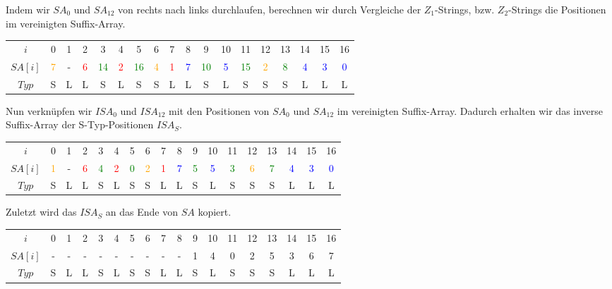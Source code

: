 Indem wir $SA_0$ und $SA_{12}$ von rechts nach links durchlaufen, berechnen wir durch Vergleiche der $Z_1$-Strings, bzw. $Z_2$-Strings die Positionen im vereinigten Suffix-Array. 

\begin{table}[H]
	\footnotesize
	\centering
	\begin{tabular}{c| c c c c c c c c c c c c c c c c c}
		$i$ & 0 & 1 & 2 & 3 & 4 & 5 & 6 & 7 & 8 & 9 & 10 & 11 & 12 & 13 & 14 & 15 & 16 \\
		$SA[i]$ & \textcolor{orange}{7} & - & \textcolor{red}{6} & \textcolor{green}{14} & \textcolor{red}{2} & \textcolor{green}{16} & \textcolor{orange}{4} & \textcolor{red}{1} & \textcolor{blue}{7} & \textcolor{green}{10} & \textcolor{blue}{5} & \textcolor{green}{15} & \textcolor{orange}{2} & \textcolor{green}{8} & \textcolor{blue}{4} & \textcolor{blue}{3} & \textcolor{blue}{0} \\
		$Typ$ & S & L & L & S & L & S & S & L & L & S & L & S & S & S & L & L & L
	\end{tabular}
\end{table}

Nun verknüpfen wir $ISA_0$ und $ISA_{12}$ mit den Positionen von $SA_0$ und $SA_{12}$ im vereinigten Suffix-Array. Dadurch erhalten wir das inverse Suffix-Array der S-Typ-Positionen $ISA_S$.

\begin{table}[H]
	\footnotesize
	\centering
	\begin{tabular}{c| c c c c c c c c c c c c c c c c c}
		$i$ & 0 & 1 & 2 & 3 & 4 & 5 & 6 & 7 & 8 & 9 & 10 & 11 & 12 & 13 & 14 & 15 & 16 \\
		$SA[i]$ & \textcolor{orange}{1} & - & \textcolor{red}{6} & \textcolor{green}{4} & \textcolor{red}{2} & \textcolor{green}{0} & \textcolor{orange}{2} & \textcolor{red}{1} & \textcolor{blue}{7} & \textcolor{green}{5} & \textcolor{blue}{5} & \textcolor{green}{3} & \textcolor{orange}{6} & \textcolor{green}{7} & \textcolor{blue}{4} & \textcolor{blue}{3} & \textcolor{blue}{0} \\
		$Typ$ & S & L & L & S & L & S & S & L & L & S & L & S & S & S & L & L & L
	\end{tabular}
\end{table}

Zuletzt wird das $ISA_S$ an das Ende von $SA$ kopiert. 

\begin{table}[H]
	\footnotesize
	\centering
	\begin{tabular}{c| c c c c c c c c c c c c c c c c c}
		$i$ & 0 & 1 & 2 & 3 & 4 & 5 & 6 & 7 & 8 & 9 & 10 & 11 & 12 & 13 & 14 & 15 & 16 \\
		$SA[i]$ & - & - & - & - & - & - & - & - & - & 1 & 4 & 0 & 2 & 5 & 3 & 6 & 7 \\
		$Typ$ & S & L & L & S & L & S & S & L & L & S & L & S & S & S & L & L & L
	\end{tabular}
\end{table}

